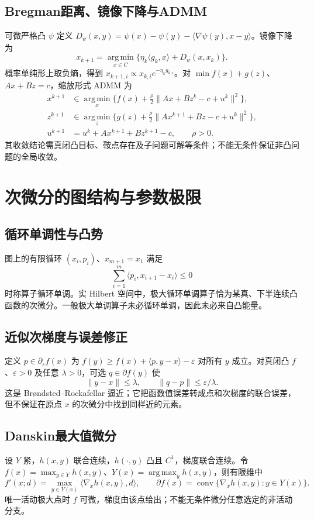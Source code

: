 \documentclass[../main.tex]{subfiles}
\begin{document}
\subsection{Bregman距离、镜像下降与ADMM}
可微严格凸 $\psi$ 定义 $D_\psi(x,y)=\psi(x)-\psi(y)-\langle\nabla\psi(y),x-y\rangle$。镜像下降为
\[
x_{k+1}=\operatorname*{arg\,min}_{x\in C}\{\eta_k\langle g_k,x\rangle+D_\psi(x,x_k)\}.
\]
概率单纯形上取负熵，得到 $x_{k+1,i}\propto x_{k,i}e^{-\eta_kg_{k,i}}$。对 $\min f(x)+g(z)$、$Ax+Bz=c$，缩放形式 ADMM 为
\begin{align*}
x^{k+1}&\in\operatorname*{arg\,min}_x\{f(x)+\tfrac\rho2\|Ax+Bz^k-c+u^k\|^2\},\\
z^{k+1}&\in\operatorname*{arg\,min}_z\{g(z)+\tfrac\rho2\|Ax^{k+1}+Bz-c+u^k\|^2\},\\
u^{k+1}&=u^k+Ax^{k+1}+Bz^{k+1}-c,\qquad\rho>0.
\end{align*}
其收敛结论需真闭凸目标、鞍点存在及子问题可解等条件；不能无条件保证非凸问题的全局收敛。

\section{次微分的图结构与参数极限}
\subsection{循环单调性与凸势}
图上的有限循环 $(x_i,p_i)$、$x_{m+1}=x_1$ 满足
\[
\sum_{i=1}^m\langle p_i,x_{i+1}-x_i\rangle\le0
\]
时称算子循环单调。实 Hilbert 空间中，极大循环单调算子恰为某真、下半连续凸函数的次微分。一般极大单调算子未必循环单调，因此未必来自凸能量。
\subsection{近似次梯度与误差修正}
定义 $p\in\partial_\varepsilon f(x)$ 为 $f(y)\ge f(x)+\langle p,y-x\rangle-\varepsilon$ 对所有 $y$ 成立。对真闭凸 $f$、$\varepsilon>0$ 及任意 $\lambda>0$，可选 $q\in\partial f(y)$ 使
\[
\|y-x\|\le\lambda,\qquad\|q-p\|\le\varepsilon/\lambda.
\]
这是 Brøndsted--Rockafellar 逼近；它把函数值误差转成点和次梯度的联合误差，但不保证在原点 $x$ 的次微分中找到同样近的元素。
\subsection{Danskin最大值微分}
设 $Y$ 紧，$h(x,y)$ 联合连续，$h(\cdot,y)$ 凸且 $C^1$，梯度联合连续。令 $f(x)=\max_{y\in Y}h(x,y)$、$Y(x)=\operatorname*{arg\,max}_yh(x,y)$，则有限维中
\[
f'(x;d)=\max_{y\in Y(x)}\langle\nabla_xh(x,y),d\rangle,\qquad
\partial f(x)=\operatorname{conv}\{\nabla_xh(x,y):y\in Y(x)\}.
\]
唯一活动极大点时 $f$ 可微，梯度由该点给出；不能无条件微分任意选定的非活动分支。
\end{document}
